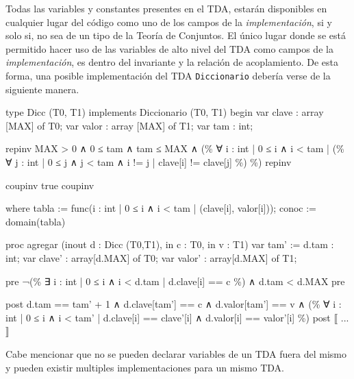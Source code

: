 Todas las variables y constantes presentes en el TDA, estarán disponibles en
cualquier lugar del código como uno de los campos de la
\textit{implementación}, si y solo si, no sea de un tipo de la Teoría de
Conjuntos. El único lugar donde se está permitido hacer uso de las variables
de alto nivel del TDA como campos de la \textit{implementación}, es dentro del
invariante y la relación de acoplamiento. De esta forma, una posible
implementación del TDA \texttt{Diccionario} debería verse de la siguiente
manera.

\begin{gracielacode}
type Dicc (T0, T1) implements Diccionario (T0, T1) begin
  var clave : array [MAX] of T0;
  var valor : array [MAX] of T1;
  var tam   : int;

  {repinv MAX > 0 ∧ 0 ≤ tam ∧ tam ≤ MAX ∧
    (\% ∀ i : int | 0 ≤ i ∧ i < tam
      | (\% ∀ j : int | 0 ≤ j ∧ j < tam ∧ i != j | clave[i] != clave[j] \%)
    \%)
  repinv}

  {coupinv true coupinv}

  where { 
  	tabla := func({i : int | 0 ≤ i ∧ i < tam | (clave[i], valor[i])});
    conoc := domain(tabla)
  }
  
  proc agregar (inout d : Dicc (T0,T1), in c : T0, in v : T1)
    var tam' := d.tam : int;  
    var clave'        : array[d.MAX] of T0;
    var valor'        : array[d.MAX] of T1;

    {pre ¬(\% ∃ i : int | 0 ≤ i ∧ i < d.tam | d.clave[i] == c \%) ∧ d.tam < d.MAX pre}

    {post d.tam == tam' + 1 ∧ d.clave[tam'] == c ∧  d.valor[tam'] == v 
              ∧ (\% ∀ i : int | 0 ≤ i ∧ i < tam' | d.clave[i] == clave'[i]
                                                ∧ d.valor[i] == valor'[i] \%) post}
    ⟦ 
     ...
    ⟧
\end{gracielacode}

Cabe mencionar que no se pueden declarar variables de un TDA fuera del mismo y
pueden existir multiples implementaciones para un mismo TDA.


